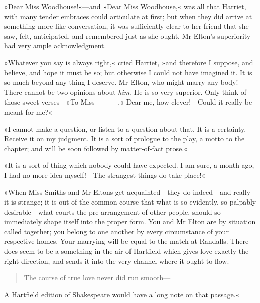»Dear Miss Woodhouse!«—and »Dear Miss Woodhouse,« was all that Harriet, with many tender embraces could articulate at first; but when they did arrive at something more like conversation, it was sufficiently clear to her friend that she saw, felt, anticipated, and remembered just as she ought. Mr Elton's superiority had very ample acknowledgment.

»Whatever you say is always right,« cried Harriet, »and therefore I suppose, and believe, and hope it must be so; but otherwise I could not have imagined it. It is so much beyond any thing I deserve. Mr Elton, who might marry any body! There cannot be two opinions about \textit{him}. He is so very superior. Only think of those sweet verses—»To Miss ———.« Dear me, how clever!—Could it really be meant for me?«

»I cannot make a question, or listen to a question about that. It is a certainty. Receive it on my judgment. It is a sort of prologue to the play, a motto to the chapter; and will be soon followed by matter-of-fact prose.«

»It is a sort of thing which nobody could have expected. I am sure, a month ago, I had no more idea myself!—The strangest things do take place!«

»When Miss Smiths and Mr Eltons get acquainted—they do indeed—and really it is strange; it is out of the common course that what is so evidently, so palpably desirable—what courts the pre-arrangement of other people, should so immediately shape itself into the proper form. You and Mr Elton are by situation called together; you belong to one another by every circumstance of your respective homes. Your marrying will be equal to the match at Randalls. There does seem to be a something in the air of Hartfield which gives love exactly the right direction, and sends it into the very channel where it ought to flow.

\begin{quote}
The course of true love never did run smooth—
\end{quote}

\begin{letter}
	\enlargethispage{\baselineskip}
\end{letter}

A Hartfield edition of Shakespeare would have a long note on that passage.«

